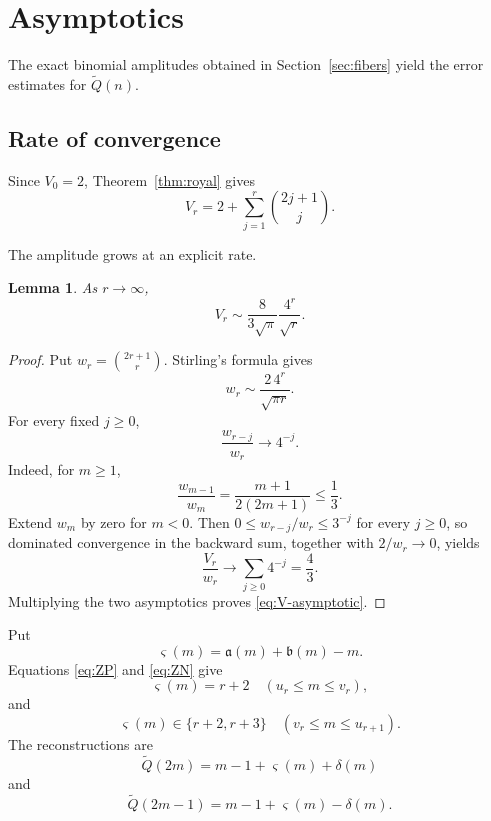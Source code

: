 \documentclass[11pt]{article}
\newtheorem{lemma}[theorem]{Lemma}
\theoremstyle{definition}
\theoremstyle{remark}
\newcommand{\Qt}{\widetilde Q}
\begin{document}
\section{Asymptotics}
\label{sec:asymptotics}

The exact binomial amplitudes obtained in Section~\ref{sec:fibers} yield the
error estimates for \(\Qt(n)\).

\subsection{Rate of convergence}

Since \(V_0=2\), Theorem~\ref{thm:royal} gives
\begin{equation}
\label{eq:V-sum}
 V_r=2+\sum_{j=1}^r\binom{2j+1}{j}.
\end{equation}

The amplitude grows at an explicit rate.
\begin{lemma}
\label{lem:V-asymptotic}
As \(r\to\infty\),
\begin{equation}
\label{eq:V-asymptotic}
 V_r\sim\frac{8}{3\sqrt\pi}\frac{4^r}{\sqrt r}.
\end{equation}
\end{lemma}

\begin{proof}
Put \(w_r=\binom{2r+1}{r}\).  Stirling's formula gives
\[
 w_r\sim\frac{2\,4^r}{\sqrt{\pi r}}.
\]
For every fixed \(j\geq0\),
\[
 \frac{w_{r-j}}{w_r}\longrightarrow4^{-j}.
\]
Indeed, for \(m\geq1\),
\[
 \frac{w_{m-1}}{w_m}=\frac{m+1}{2(2m+1)}\leq\frac13.
\]
Extend \(w_m\) by zero for \(m<0\).  Then
\(0\leq w_{r-j}/w_r\leq3^{-j}\) for every \(j\geq0\), so dominated
convergence in the backward sum, together with \(2/w_r\to0\), yields
\[
 \frac{V_r}{w_r}\longrightarrow\sum_{j\geq0}4^{-j}=\frac43.
\]
Multiplying the two asymptotics proves \eqref{eq:V-asymptotic}.
\end{proof}

Put
\begin{equation*}
 \varsigma(m)=\mathfrak a(m)+\mathfrak b(m)-m.
\end{equation*}
Equations \eqref{eq:ZP} and \eqref{eq:ZN} give
\begin{equation}
\label{eq:drift-values}
 \varsigma(m)=r+2\quad(u_r\leq m\leq v_r),
\end{equation}
and
\begin{equation*}
 \varsigma(m)\in\{r+2,r+3\}
 \quad(v_r\leq m\leq u_{r+1}).
\end{equation*}
The reconstructions are
\begin{equation}
\label{eq:Qt-even-reconstruction}
 \Qt(2m)=m-1+\varsigma(m)+\delta(m)
\end{equation}
and
\begin{equation}
\label{eq:Qt-odd-reconstruction}
 \Qt(2m-1)=m-1+\varsigma(m)-\delta(m).
\end{equation}
\end{document}
